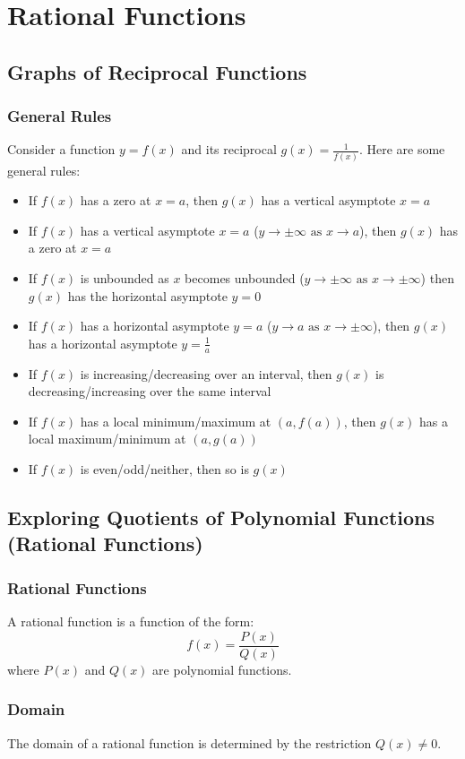 \chapter{Rational Functions}
	\section{Graphs of Reciprocal Functions}
		\subsection{General Rules}
			Consider a function $y=f(x)$ and its reciprocal $g(x) = \frac{1}{f(x)}$. Here are some general rules:
			\begin{itemize}
				\item If $f(x)$ has a zero at $x=a$, then $g(x)$ has a vertical asymptote $x=a$
				\item If $f(x)$ has a vertical asymptote $x=a$ ($y \to \pm\infty \text{ as } x \to a$), then $g(x)$ has a zero at $x=a$
				\item If $f(x)$ is unbounded as $x$ becomes unbounded ($y \to \pm\infty \text{ as } x \to \pm\infty$) then $g(x)$ has the horizontal asymptote $y=0$
				\item If $f(x)$ has a horizontal asymptote $y=a$ ($y \to a \text{ as } x \to \pm\infty$), then $g(x)$ has a horizontal asymptote $y=\frac{1}{a}$
				\item If $f(x)$ is increasing/decreasing over an interval, then $g(x)$ is decreasing/increasing over the same interval
				\item If $f(x)$ has a local minimum/maximum at $(a, f(a))$, then $g(x)$ has a local maximum/minimum at $(a, g(a))$
				\item If $f(x)$ is even/odd/neither, then so is $g(x)$
			\end{itemize}
	\section{Exploring Quotients of Polynomial Functions (Rational Functions)}
		\subsection{Rational Functions}
			A rational function is a function of the form:
			\[f(x)=\frac{P(x)}{Q(x)}\]
			where $P(x)$ and $Q(x)$ are polynomial functions.
		\subsection{Domain}
			The domain of a rational function is determined by the restriction $Q(x) \neq 0$.
